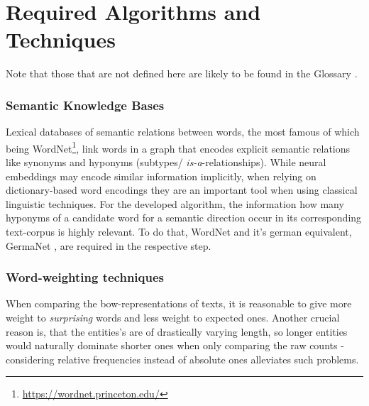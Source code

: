 \section{Required Algorithms and Techniques}

Note that those that are not defined here are likely to be found in the Glossary .

\subsubsection*{Semantic Knowledge Bases}

Lexical databases of semantic relations between words, the most famous of which being WordNet\footnote{\url{https://wordnet.princeton.edu/}}, link words in a graph that encodes explicit semantic relations like synonyms and hyponyms (subtypes/ \emph{is-a}-relationships). While neural %
embeddings may encode similar information implicitly, when relying on dictionary-based word encodings they are an important tool when using classical linguistic techniques. For the developed algorithm, the information how many hyponyms of a candidate word for a semantic direction %
occur in its corresponding text-corpus is highly relevant. To do that, WordNet \cite{Miller1995} and it's german equivalent, GermaNet \cite{hamp-feldweg-1997-germanet,Henrich}, are required in the respective step.


\subsubsection*{Word-weighting techniques}

\label{sec:word_count_techniques}

When comparing the \gls{bow}-representations of texts, it is reasonable to give more weight to \emph{surprising} words and less weight to expected ones.  \cite[156]{Turney2010} 
Another crucial reason is, that the entities's are of drastically varying length, so longer entities would naturally dominate shorter ones when only comparing the raw counts - considering relative frequencies instead of absolute ones alleviates such problems.

